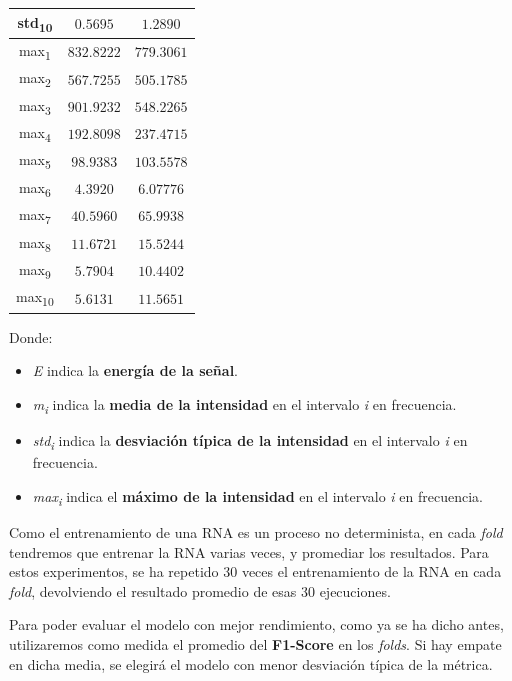 \documentclass[12pt]{article}
\begin{document}
\begin{table}[!ht]
\begin{tabular}{||c c c||}
			\hline
			std\textsubscript{10} & $0.5695$ & $1.2890$ \\
			\hline
			max\textsubscript{1} & $832.8222$ & $779.3061$ \\
			\hline
			max\textsubscript{2} & $567.7255$ & $505.1785$ \\
			\hline
			max\textsubscript{3} & $901.9232$ & $548.2265$ \\
			\hline
			max\textsubscript{4} & $192.8098$ & $237.4715$ \\
			\hline
			max\textsubscript{5} & $98.9383$ & $103.5578$ \\
			\hline
			max\textsubscript{6} & $4.3920$ & $6.07776$ \\
			\hline
			max\textsubscript{7} & $40.5960$ & $65.9938$ \\
			\hline
			max\textsubscript{8} & $11.6721$ & $15.5244$ \\
			\hline
			max\textsubscript{9} & $5.7904$ & $10.4402$ \\
			\hline
			max\textsubscript{10} & $5.6131$ & $11.5651$ \\
			\hline
		\end{tabular}
	\label{Tab:Features_1}
\end{table}
Donde:
\begin{itemize}
	\item \textit{E} indica la \textbf{energía de la señal}.
	\item \textit{m\textsubscript{i}} indica la \textbf{media de la intensidad} en el intervalo \textit{i} en frecuencia.
	\item \textit{std\textsubscript{i}} indica la \textbf{desviación típica de la intensidad} en el intervalo \textit{i} en frecuencia.
	\item \textit{max\textsubscript{i}} indica el \textbf{máximo de la intensidad} en el intervalo \textit{i} en frecuencia.
\end{itemize}	

\newpage
Como el entrenamiento de una RNA es un proceso no determinista, en cada \textit{fold}
tendremos que entrenar la RNA varias veces, y promediar los resultados. Para estos experimentos,
se ha repetido 30 veces el entrenamiento de la RNA en cada \textit{fold}, devolviendo el resultado promedio de esas 30 ejecuciones.

\bigskip
Para poder evaluar el modelo con mejor rendimiento, como ya se ha dicho antes, utilizaremos como medida el promedio
del \textbf{F1-Score} en los \textit{folds}. Si hay empate en dicha media, se elegirá el modelo con menor
desviación típica de la métrica.
\end{document}
